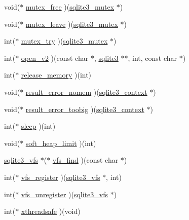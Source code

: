 \begin{DoxyCompactItemize}
\item 
void($\ast$ \hyperlink{structsqlite3__api__routines_a055c0e268a30b76af04f7cfac6ad2b6d}{mutex\-\_\-free} )(\hyperlink{structsqlite3__mutex}{sqlite3\-\_\-mutex} $\ast$)
\item 
void($\ast$ \hyperlink{structsqlite3__api__routines_ae599184431cf669551ae88f4ca7373c0}{mutex\-\_\-leave} )(\hyperlink{structsqlite3__mutex}{sqlite3\-\_\-mutex} $\ast$)
\item 
int($\ast$ \hyperlink{structsqlite3__api__routines_a04b95233a9977a34ff0f2d9fab44e507}{mutex\-\_\-try} )(\hyperlink{structsqlite3__mutex}{sqlite3\-\_\-mutex} $\ast$)
\item 
int($\ast$ \hyperlink{structsqlite3__api__routines_ac6da992cdbb490e1d1e856a4864851bf}{open\-\_\-v2} )(const char $\ast$, \hyperlink{structsqlite3}{sqlite3} $\ast$$\ast$, int, const char $\ast$)
\item 
int($\ast$ \hyperlink{structsqlite3__api__routines_a2dbb78dde331812425108d9eaeba7bf1}{release\-\_\-memory} )(int)
\item 
void($\ast$ \hyperlink{structsqlite3__api__routines_abaccd85342d77c068d05de2b9cd9c7e0}{result\-\_\-error\-\_\-nomem} )(\hyperlink{structsqlite3__context}{sqlite3\-\_\-context} $\ast$)
\item 
void($\ast$ \hyperlink{structsqlite3__api__routines_acc888c07a82710c1f0c791ba3058c44c}{result\-\_\-error\-\_\-toobig} )(\hyperlink{structsqlite3__context}{sqlite3\-\_\-context} $\ast$)
\item 
int($\ast$ \hyperlink{structsqlite3__api__routines_ae7d2a4258889ab0de44cfce3a9f4b02b}{sleep} )(int)
\item 
void($\ast$ \hyperlink{structsqlite3__api__routines_a217004dbd021cb40d5ad24f963c68451}{soft\-\_\-heap\-\_\-limit} )(int)
\item 
\hyperlink{structsqlite3__vfs}{sqlite3\-\_\-vfs} $\ast$($\ast$ \hyperlink{structsqlite3__api__routines_ae08c82348507252bf3775f265caa229e}{vfs\-\_\-find} )(const char $\ast$)
\item 
int($\ast$ \hyperlink{structsqlite3__api__routines_a0bc5bcc67851f8ceab8114b89f59328d}{vfs\-\_\-register} )(\hyperlink{structsqlite3__vfs}{sqlite3\-\_\-vfs} $\ast$, int)
\item 
int($\ast$ \hyperlink{structsqlite3__api__routines_ad501d3d8cf518597e863660dfe6922e8}{vfs\-\_\-unregister} )(\hyperlink{structsqlite3__vfs}{sqlite3\-\_\-vfs} $\ast$)
\item 
int($\ast$ \hyperlink{structsqlite3__api__routines_ab3607e01452a88c8bd0251cf732ff796}{xthreadsafe} )(void)
$$
\end{DoxyCompactItemize}
